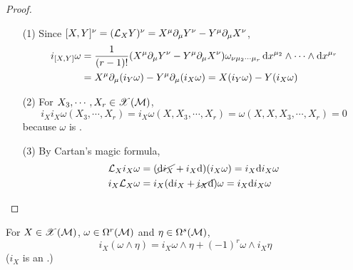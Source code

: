 \documentclass[a4paper, 10pt]{article}
\begin{document}
\begin{proof}
    \hphantom{.}
    \begin{itemize}
        \item[(1)] Since $[X,Y]^{\nu} = (\mathcal{L}_{X}Y)^{\nu} = X^{\mu}\partial_{\mu}Y^{\nu} - Y^{\mu}\partial_{\mu}X^{\nu}$,
        \begin{align*}
            i_{[X,Y]}\omega &= \frac{1}{(r-1)!} (X^{\mu}\partial_{\mu}Y^{\nu} - Y^{\mu}\partial_{\mu}X^{\nu}) \omega_{\nu\mu_{2}\cdots\mu_{r}} \, \mathrm{d}{x}^{\mu_{2}} \wedge \cdots \wedge \mathrm{d}{x}^{\mu_{r}} \\
            &= X^{\mu}\partial_{\mu}(i_{Y}\omega) - Y^{\mu}\partial_{\mu}(i_{X}\omega) = X(i_{Y}\omega) - Y(i_{X}\omega)
        \end{align*}
        \item[(2)] For $X_{3},\cdots,X_{r} \in \mathscr{X}(\mathcal{M})$,
        \[ i_{X}i_{X}\omega(X_{3},\cdots,X_{r}) = i_{X}\omega(X,X_{3},\cdots,X_{r}) = \omega(X,X,X_{3},\cdots,X_{r}) = 0 \]
        because $\omega$ is .
        \item[(3)] By Cartan's magic formula,
        \begin{align*}
            \mathcal{L}_{X}i_{X}\omega &= (\cancel{\mathrm{d} i_{X}} + i_{X}\mathrm{d})(i_{X}\omega) = i_{X}\mathrm{d} i_{X}\omega \\
            i_{X}\mathcal{L}_{X}\omega &= i_{X}(\mathrm{d} i_{X}+\cancel{i_{X}\mathrm{d}})\omega = i_{X}\mathrm{d} i_{X}\omega
        \end{align*}
    \end{itemize}
\end{proof}
\newpage


\begin{exer}
    For $X \in \mathscr{X}(\mathcal{M})$, $\omega \in \Omega^{r}(\mathcal{M})$ and $\eta \in \Omega^{s}(\mathcal{M})$,
    \[ i_{X}(\omega \wedge \eta) = i_{X}\omega \wedge \eta + (-1)^{r}\omega \wedge i_{X}\eta \]
    ($i_{X}$ is an .)
\end{exer}
\end{document}
